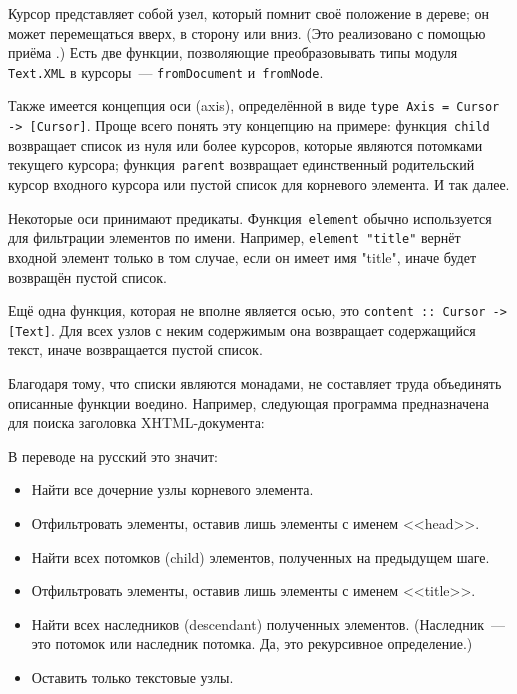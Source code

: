 Курсор представляет собой узел, который помнит своё положение в дереве; он
может перемещаться вверх, в сторону или вниз. (Это реализовано с помощью приёма
.) Есть две функции, позволяющие преобразовывать типы модуля
\lstinline!Text.XML! в курсоры~--- \lstinline!fromDocument!
и~\lstinline!fromNode!.

Также имеется концепция оси (axis), определённой в виде
\lstinline!type Axis = Cursor -> [Cursor]!.
Проще всего понять эту концепцию на примере:
функция~\lstinline!child! возвращает список из нуля или более курсоров, которые
являются потомками текущего курсора; функция~\lstinline!parent! возвращает
единственный родительский курсор входного курсора или пустой список для
корневого элемента. И так далее.

Некоторые оси принимают предикаты. Функция~\lstinline!element! обычно
используется для фильтрации элементов по имени. Например, \lstinline!element "title"!
вернёт входной элемент только в том случае, если он имеет имя "title",
иначе будет возвращён пустой список.

Ещё одна функция, которая не вполне является осью, это
\lstinline!content :: Cursor -> [Text]!.
Для всех узлов с неким содержимым она возвращает содержащийся текст, иначе
возвращается пустой список.

Благодаря тому, что списки являются монадами, не составляет труда объединять
описанные функции воедино. Например, следующая программа предназначена для
поиска заголовка XHTML-документа:


В переводе на русский это значит:
\begin{itemize}
    \item Найти все дочерние узлы корневого элемента.

    \item Отфильтровать элементы, оставив лишь элементы с именем <<head>>.

    \item Найти всех потомков (child) элементов, полученных на предыдущем шаге.

    \item Отфильтровать элементы, оставив лишь элементы с именем <<title>>.

    \item Найти всех наследников (descendant) полученных элементов.
        (Наследник~--- это потомок или наследник потомка. Да, это рекурсивное
        определение.)

    \item Оставить только текстовые узлы.
\end{itemize}

